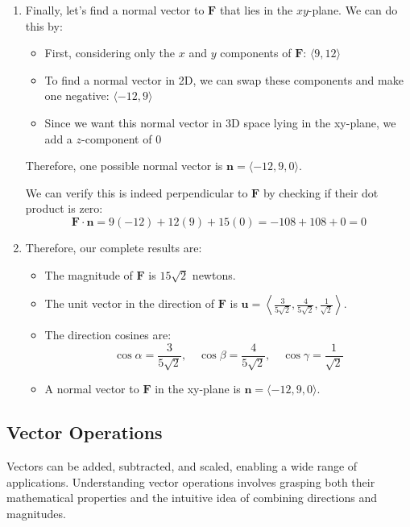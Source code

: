 \begin{example}
\begin{solution}
\begin{enumerate}
\item Finally, let's find a normal vector to \( \mathbf{F} \) that lies in the $xy$-plane. We can do this by:
\begin{itemize}
    \item First, considering only the $x$ and $y$ components of \( \mathbf{F} \): \( \langle 9, 12 \rangle \)
    \item To find a normal vector in 2D, we can swap these components and make one negative: \( \langle -12, 9 \rangle \)
    \item Since we want this normal vector in 3D space lying in the xy-plane, we add a $z$-component of $0$
\end{itemize}
Therefore, one possible normal vector is \( \mathbf{n} = \langle -12, 9, 0 \rangle \).

We can verify this is indeed perpendicular to \( \mathbf{F} \) by checking if their dot product is zero:
\[
\mathbf{F} \cdot \mathbf{n} = 9(-12) + 12(9) + 15(0) = -108 + 108 + 0 = 0
\]

\item Therefore, our complete results are:
\begin{itemize}
\item The magnitude of \( \mathbf{F} \) is \( 15\sqrt{2} \) newtons.
\item The unit vector in the direction of \( \mathbf{F} \) is \( \mathbf{u} = \left\langle \frac{3}{5\sqrt{2}}, \frac{4}{5\sqrt{2}}, \frac{1}{\sqrt{2}} \right\rangle \).
\item The direction cosines are:
\[
\cos \alpha = \frac{3}{5\sqrt{2}}, \quad \cos \beta = \frac{4}{5\sqrt{2}}, \quad \cos \gamma = \frac{1}{\sqrt{2}}
\]
\item A normal vector to \( \mathbf{F} \) in the xy-plane is \( \mathbf{n} = \langle -12, 9, 0 \rangle \).
    \end{itemize}
\end{enumerate}

\end{solution}
\end{example}
\exampleline







\subsection*{Vector Operations} 

Vectors can be added, subtracted, and scaled, enabling a wide range of applications. Understanding vector operations involves grasping both their mathematical properties and the intuitive idea of combining directions and magnitudes.


